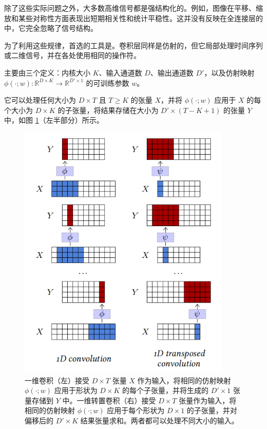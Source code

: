 除了这些实际问题之外，大多数高维信号都是强结构化的。例如，图像在平移、缩放和某些对称性方面表现出短期相关性和统计平稳性。这并没有反映在全连接层的中，它完全忽略了信号结构。

为了利用这些规律，首选的工具是。卷积层同样是仿射的，但它局部处理时间序列或二维信号，并在各处使用相同的操作符。

主要由三个定义：内核大小 $K$、输入通道数 $D$、输出通道数 $D'$，以及仿射映射 $\phi(\cdot;w):\mathbb{R}^{D \times K} \to \mathbb{R}^{D' \times 1}$ 的可训练参数 $w$。

它可以处理任何大小为 $D \times T$ 且 $T \ge K$ 的张量 $X$，并将 $\phi(\cdot;w)$ 应用于 $X$ 的每个大小为 $D \times K$ 的子张量，将结果存储在大小为 $D' \times (T-K+1)$ 的张量 $Y$ 中，如图 \ref{fig4.1}（左半部分）所示。

\newpage

\begin{figure}[h]
    \centering
    \includegraphics[width=0.9\textwidth]{fig/fig4.1.png}
    \caption[一维卷积]{一维卷积（左）接受 $D \times T$ 张量 $X$ 作为输入，将相同的仿射映射 $\phi(\cdot;w)$ 应用于形状为 $D \times K$ 的每个子张量，并将生成的 $D' \times 1$ 张量存储到 $Y$ 中。一维转置卷积（右）接受 $D \times T$ 张量作为输入，将相同的仿射映射 $\phi(\cdot;w)$ 应用于每个形状为 $D \times 1$ 的子张量，并对偏移后的 $D' \times K$ 结果张量求和。两者都可以处理不同大小的输入。}
    \label{fig4.1}
\end{figure}

